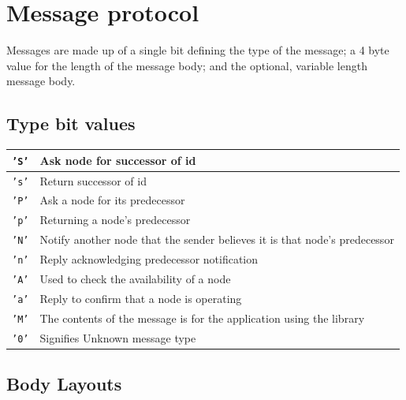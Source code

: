 \documentclass{article}
\begin{document}
\section{Message protocol}

Messages are made up of a single bit defining the type of the message; a 4 byte value for the length of the message body; and the optional, variable length message body.

\subsection{Type bit values}
\begin{tabular}{|l | l|}
\hline
\texttt{'S'} & Ask node for successor of id \\\hline
\texttt{'s'} & Return successor of id \\\hline
\texttt{'P'} & Ask a node for its predecessor \\\hline
\texttt{'p'} & Returning a node's predecessor \\\hline
\texttt{'N'} & Notify another node that the sender believes it is that node's predecessor \\\hline
\texttt{'n'} & Reply acknowledging predecessor notification \\\hline
\texttt{'A'} & Used to check the availability of a node\\\hline
\texttt{'a'} & Reply to confirm that a node is operating \\\hline
\texttt{'M'} & The contents of the message is for the application using the library \\\hline
\texttt{'0'} & Signifies Unknown message type \\\hline
\end{tabular}

\subsection{Body Layouts}
\end{document}
